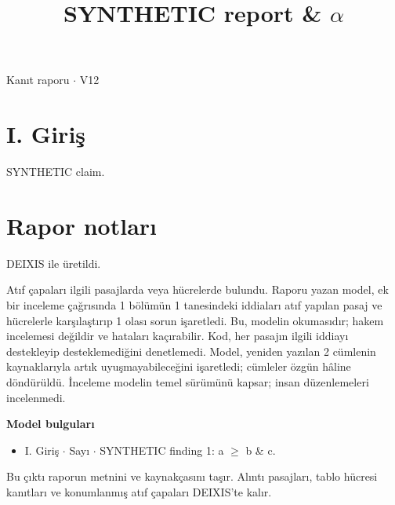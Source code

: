 \documentclass[journal]{IEEEtran}
\begin{document}
\renewcommand{\abstractname}{Özet}
\renewcommand{\IEEEkeywordsname}{Dizin Terimleri}
\renewcommand{\refname}{Kaynaklar}

\title{SYNTHETIC report \& \ensuremath{\alpha}}

\maketitle

\noindent Kanıt raporu \ensuremath{\cdot} V12

\section*{I. Giriş}

SYNTHETIC claim. \cite{Synth26}

\section*{Rapor notları}

DEIXIS ile üretildi.

Atıf çapaları ilgili pasajlarda veya hücrelerde bulundu. Raporu yazan model, ek bir inceleme çağrısında 1 bölümün 1 tanesindeki iddiaları atıf yapılan pasaj ve hücrelerle karşılaştırıp 1 olası sorun işaretledi. Bu, modelin okumasıdır; hakem incelemesi değildir ve hataları kaçırabilir. Kod, her pasajın ilgili iddiayı destekleyip desteklemediğini denetlemedi. Model, yeniden yazılan 2 cümlenin kaynaklarıyla artık uyuşmayabileceğini işaretledi; cümleler özgün hâline döndürüldü. İnceleme modelin temel sürümünü kapsar; insan düzenlemeleri incelenmedi.

\noindent\textbf{Model bulguları}

\begin{itemize}
\item I. Giriş \ensuremath{\cdot} Sayı \ensuremath{\cdot} SYNTHETIC finding 1: a \ensuremath{\geq} b \& c.
\end{itemize}

Bu çıktı raporun metnini ve kaynakçasını taşır. Alıntı pasajları, tablo hücresi kanıtları ve konumlanmış atıf çapaları DEIXIS'te kalır.




\end{document}
